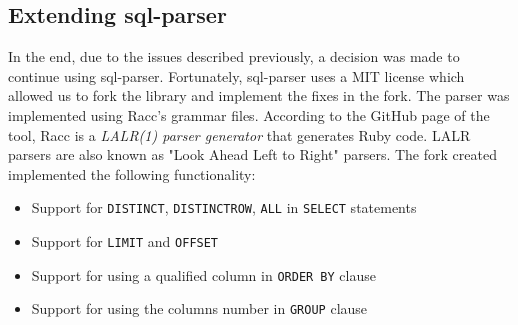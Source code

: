 \subsection{Extending sql-parser}

In the end, due to the issues described previously, a decision was made to continue using sql-parser. Fortunately, sql-parser uses a MIT license which allowed us to fork the library and implement the fixes in the fork. The parser was implemented using Racc's grammar files. According to the GitHub page of the tool, Racc is a \textit{LALR(1) parser generator} that generates Ruby code. LALR parsers are also known as "Look Ahead Left to Right" parsers. The fork created implemented the following functionality:
\begin{itemize}
    \item Support for \texttt{DISTINCT}, \texttt{DISTINCTROW}, \texttt{ALL} in \texttt{SELECT} statements
    \item Support for \texttt{LIMIT} and \texttt{OFFSET}
    \item Support for using a qualified column in \texttt{ORDER BY} clause
    \item Support for using the columns number in \texttt{GROUP} clause
\end{itemize}

